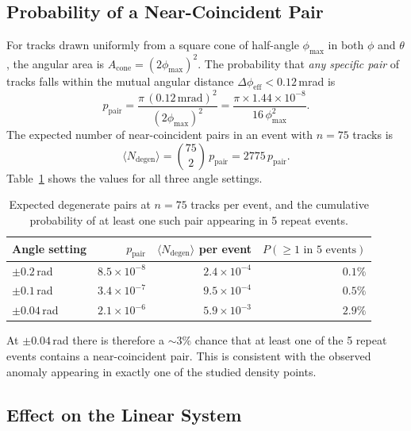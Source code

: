 \documentclass[12pt,a4paper]{article}
\begin{document}
\subsection{Probability of a Near-Coincident Pair}
\label{sec:probability}

For tracks drawn uniformly from a square cone of half-angle $\phi_\text{max}$
in both $\phi$ and $\theta$, the angular area is $A_\text{cone} =
(2\phi_\text{max})^2$.
The probability that \emph{any specific pair} of tracks falls within the
mutual angular distance $\Delta\phi_\text{eff} < 0.12$\,mrad is
\begin{equation}
  p_\text{pair} = \frac{\pi\,(0.12\,\text{mrad})^2}{(2\phi_\text{max})^2}
  = \frac{\pi \times 1.44\times10^{-8}}{16\,\phi_\text{max}^2}.
  \label{eq:ppair}
\end{equation}
The expected number of near-coincident pairs in an event with $n=75$ tracks is
\begin{equation}
  \langle N_\text{degen}\rangle
  = \binom{75}{2}\,p_\text{pair}
  = 2775\,p_\text{pair}.
  \label{eq:ndegen}
\end{equation}
Table~\ref{tab:prob} shows the values for all three angle settings.

\begin{table}[h!]
  \centering
  \caption{Expected degenerate pairs at $n=75$ tracks per event, and the
    cumulative probability of at least one such pair appearing in 5 repeat
    events.}
  \label{tab:prob}
  \begin{tabular}{lrrr}
    \toprule
    Angle setting & $p_\text{pair}$ & $\langle N_\text{degen}\rangle$ per event &
    $P(\geq1\text{ in }5\text{ events})$ \\
    \midrule
    $\pm0.2$\,rad & $8.5 \times 10^{-8}$ & $2.4\times10^{-4}$ & $0.1\%$ \\
    $\pm0.1$\,rad & $3.4 \times 10^{-7}$ & $9.5\times10^{-4}$ & $0.5\%$ \\
    $\pm0.04$\,rad & $2.1 \times 10^{-6}$ & $5.9\times10^{-3}$ & $2.9\%$ \\
    \bottomrule
  \end{tabular}
\end{table}

\noindent At $\pm0.04$\,rad there is therefore a $\sim$$3\%$ chance that
at least one of the 5 repeat events contains a near-coincident pair.
This is consistent with the observed anomaly appearing in exactly one of
the studied density points.

\subsection{Effect on the Linear System}
\label{sec:matrix_effect}
\end{document}
